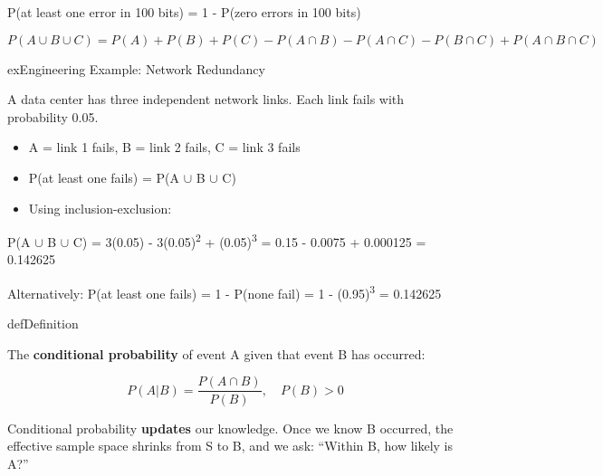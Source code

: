 \begin{PSquote}

P(at least one error in 100 bits) = 1 - P(zero errors in 100 bits)

\end{PSquote}


\[P(A \cup B \cup C) = P(A) + P(B) + P(C) - P(A \cap B) - P(A \cap C) - P(B \cap C) + P(A \cap B \cap C)\]

\begin{PSbox}[unbreakable]{ex}{Engineering Example: Network Redundancy}

A data center has three independent network links. Each link fails with probability 0.05.

\begin{itemize}
\tightlist
\item
  A = link 1 fails, B = link 2 fails, C = link 3 fails
\item
  P(at least one fails) = P(A \ensuremath{\cup} B \ensuremath{\cup} C)
\item
  Using inclusion-exclusion:
\end{itemize}

P(A \ensuremath{\cup} B \ensuremath{\cup} C) = 3(0.05) - 3(0.05)\textsuperscript{2} + (0.05)\textsuperscript{3} = 0.15 - 0.0075 + 0.000125 = 0.142625

Alternatively: P(at least one fails) = 1 - P(none fail) = 1 - (0.95)\textsuperscript{3} = 0.142625 \PSyes{}

\end{PSbox}


\begin{PSbox}[unbreakable]{def}{Definition}

The \textbf{conditional probability} of event A given that event B has occurred:

\[P(A|B) = \frac{P(A \cap B)}{P(B)}, \quad P(B) > 0\]

\end{PSbox}


Conditional probability \textbf{updates} our knowledge. Once we know B occurred, the effective sample space shrinks from S to B, and we ask: ``Within B, how likely is A?''


